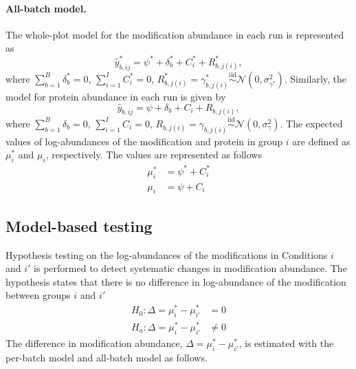 \documentclass{mcp}
\begin{document}
\paragraph{All-batch model.} The whole-plot model for the modification abundance in each run is represented as 
\[
\hat{y}_{b, ij}^{\ast} = \psi^{\ast} + \delta_{b}^{\ast} + C_{i}^{\ast} + R_{b, j(i)}^{\ast},
\]
where $\sum_{b=1}^{B} \delta_{b}^{\ast} = 0$, $\sum_{i=1}^{I} C_{i}^{\ast} = 0$, $R_{b, j(i)}^{\ast} = \gamma_{b, j(i)}^{\ast} \stackrel{\text{iid}}{\sim} \mathcal{N}(0, \sigma_{\gamma^{\ast}}^{2})$.
Similarly, the model for protein abundance in each run is given by
\[
\hat{y}_{b, ij} = \psi + \delta_{b} + C_{i} + R_{b, j(i)},
\]
where $\sum_{b=1}^{B} \delta_{b} = 0$, $\sum_{i=1}^{I} C_{i} = 0$, $R_{b, j(i)} = \gamma_{b, j(i)} \stackrel{\text{iid}}{\sim} \mathcal{N}(0, \sigma_{\gamma}^{2})$. The expected values of log-abundances of the modification and protein in group $i$ are defined as $\mu_{i}^{\ast}$ and $\mu_{i}$, respectively. The values are represented as follows
\begin{align*}
\mu_{i}^{\ast} &= \psi^{\ast} + C_{i}^{\ast}\\
\mu_{i} &= \psi + C_{i}
\end{align*}


\subsection{Model-based testing}
Hypothesis testing on the log-abundances of the modifications in Conditions $i$ and $i'$ is performed to detect systematic changes in modification abundance. The hypothesis states that there is no difference in log-abundance of the modification between groups $i$ and $i'$
\begin{align*}
H_{0}: \Delta = \mu_{i}^{\ast} - \mu_{i'}^{\ast} &= 0 \\
H_{a}: \Delta = \mu_{i}^{\ast} - \mu_{i'}^{\ast} &\neq 0
\end{align*}
The difference in modification abundance, $\Delta = \mu_{i}^{\ast} - \mu_{i'}^{\ast}$, is estimated with the per-batch model and all-batch model as follows.
\end{document}
